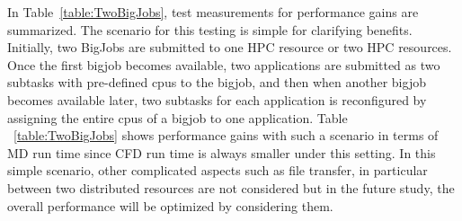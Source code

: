 \documentclass[conference,final]{IEEEtran}
\newcommand{\jhanote}[1]{ {\textcolor{red} { ***Jha: #1 }}}
\newcommand{\jhanote}[1]{}
\begin{document}
In Table~\ref{table:TwoBigJobs}, test measurements for performance
gains are summarized. The scenario for this testing is simple for
clarifying benefits. Initially, two BigJobs are submitted to one HPC
resource or two HPC resources. Once the first bigjob becomes
available, two applications are submitted as two subtasks with
pre-defined cpus to the bigjob, and then when another bigjob becomes
available later, two subtasks for each application is reconfigured by
assigning the entire cpus of a bigjob to one application. Table
~\ref{table:TwoBigJobs} shows performance gains with such a scenario
in terms of MD run time since CFD run time is always smaller under
this setting. In this simple scenario, other complicated aspects such
as file transfer, in particular between two distributed resources are
not considered but in the future study, the overall performance will
be optimized by considering them.

\end{document}
